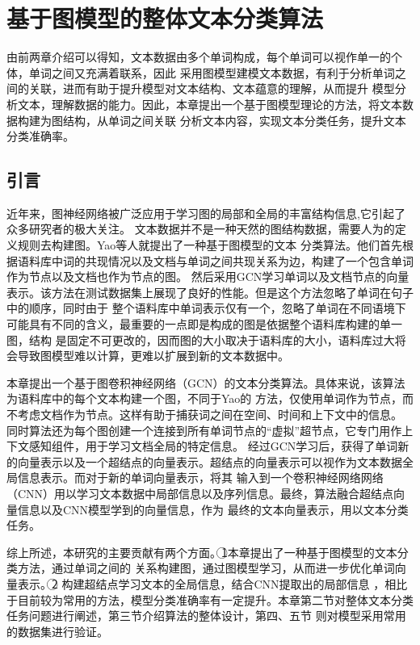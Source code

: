 \chapter{基于图模型的整体文本分类算法}
由前两章介绍可以得知，文本数据由多个单词构成，每个单词可以视作单一的个体，单词之间又充满着联系，因此
采用图模型建模文本数据，有利于分析单词之间的关联，进而有助于提升模型对文本结构、文本蕴意的理解，从而提升
模型分析文本，理解数据的能力。因此，本章提出一个基于图模型理论的方法，将文本数据构建为图结构，从单词之间关联
分析文本内容，实现文本分类任务，提升文本分类准确率。
\section{引言}
近年来，图神经网络被广泛应用于学习图的局部和全局的丰富结构信息,它引起了众多研究者的极大关注。
文本数据并不是一种天然的图结构数据，需要人为的定义规则去构建图。Yao等人就提出了一种基于图模型的文本
分类算法。他们首先根据语料库中词的共现情况以及文档与单词之间共现关系为边，构建了一个包含单词作为节点以及文档也作为节点的图。
然后采用GCN学习单词以及文档节点的向量表示。该方法在测试数据集上展现了良好的性能。但是这个方法忽略了单词在句子中的顺序，同时由于
整个语料库中单词表示仅有一个，忽略了单词在不同语境下可能具有不同的含义，最重要的一点即是构成的图是依据整个语料库构建的单一图，结构
是固定不可更改的，因而图的大小取决于语料库的大小，语料库过大将会导致图模型难以计算，更难以扩展到新的文本数据中。

本章提出一个基于图卷积神经网络（GCN）的文本分类算法。具体来说，该算法为语料库中的每个文本构建一个图，不同于Yao的
方法，仅使用单词作为节点，而不考虑文档作为节点。这样有助于捕获词之间在空间、时间和上下文中的信息。
同时算法还为每个图创建一个连接到所有单词节点的“虚拟”超节点，它专门用作上下文感知组件，用于学习文档全局的特定信息。
经过GCN学习后，获得了单词新的向量表示以及一个超结点的向量表示。超结点的向量表示可以视作为文本数据全局信息表示。而对于新的单词向量表示，将其
输入到一个卷积神经网络网络（CNN）用以学习文本数据中局部信息以及序列信息。最终，算法融合超结点向量信息以及CNN模型学到的向量信息，作为
最终的文本向量表示，用以文本分类任务。

综上所述，本研究的主要贡献有两个方面。\noindent\textcircled{1}本章提出了一种基于图模型的文本分类方法，通过单词之间的
关系构建图，通过图模型学习，从而进一步优化单词向量表示。\noindent\textcircled{2} 构建超结点学习文本的全局信息，结合CNN提取出的局部信息
，相比于目前较为常用的方法，模型分类准确率有一定提升。本章第二节对整体文本分类任务问题进行阐述，第三节介绍算法的整体设计，第四、五节
则对模型采用常用的数据集进行验证。

